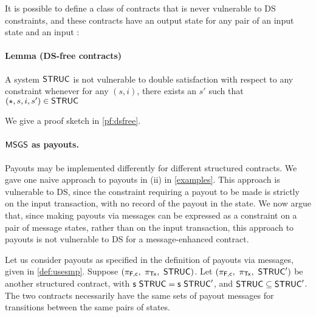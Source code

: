 It is possible to define a class of contracts that is never vulnerable to DS constraints,
and these contracts have an output state for any pair of an input state and an input :

\paragraph{Lemma (DS-free contracts)}
\label{lem:dsfree}

  A system $\mathsf{STRUC}$ is not vulnerable to double satisfaction with respect to any
  constraint whenever for any $(s, i)$, there exists
  an $s'$ such that $(\star, s, i, s') \in \mathsf{STRUC}$ \newline

We give a proof sketch in \ref{pf:dsfree}.

\paragraph{$\mathsf{MSGS}$ as payouts. }

Payouts may be implemented differently for different structured contracts.
We gave one naive approach to payouts in (ii) in \ref{examples}. This approach is
vulnerable to DS, since the constraint requiring a payout to be made is strictly
on the input transaction, with no record of the payout in the state.
We now argue that, since making payouts via messages can be expressed as
a constraint on a pair of message states, rather than on the input transaction,
this approach to payouts is not vulnerable to DS for a message-enhanced contract.

Let us consider payouts as specified in the definition of payouts via messages,
given in \ref{def:usesmp}.
Suppose $(\pi_{\mathsf{F,c}},~\pi_{\mathsf{Tx}},~\mathsf{STRUC})$. Let
 $(\pi_{\mathsf{F,c}},~\pi_{\mathsf{Tx}},~\mathsf{STRUC}')$ be another structured contract,
with $\mathsf{s}~\mathsf{STRUC} = \mathsf{s}~\mathsf{STRUC}'$, and $\mathsf{STRUC} \subseteq \mathsf{STRUC}'$.
The two contracts necessarily have the same sets of payout messages for
transitions between the same pairs of states.

